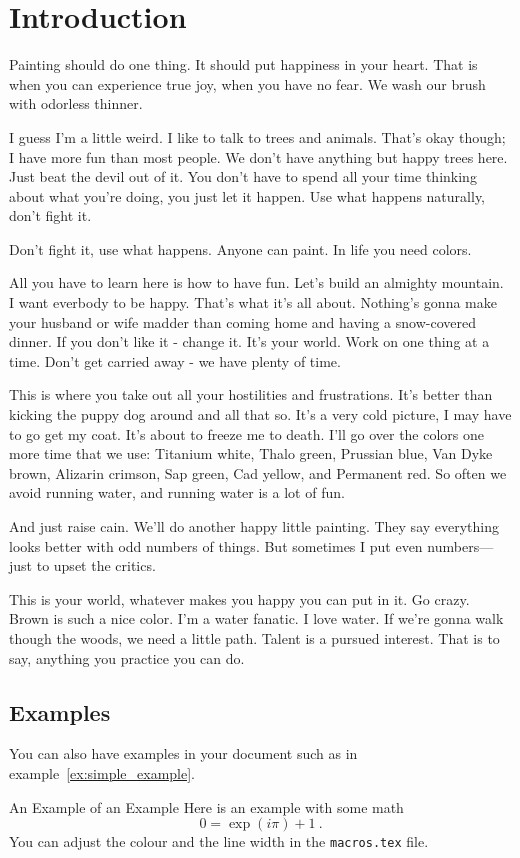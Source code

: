 \chapter{Introduction}\label{ch:introduction}
Painting should do one thing. It should put happiness in your heart. That is when you can experience true joy, when you have no fear. We wash our brush with odorless thinner.

I guess I'm a little weird. I like to talk to trees and animals. That's okay though; I have more fun than most people. We don't have anything but happy trees here. Just beat the devil out of it. You don't have to spend all your time thinking about what you're doing, you just let it happen. Use what happens naturally, don't fight it.

Don't fight it, use what happens. Anyone can paint. In life you need colors.

All you have to learn here is how to have fun. Let's build an almighty mountain. I want everbody to be happy. That's what it's all about. Nothing's gonna make your husband or wife madder than coming home and having a snow-covered dinner. If you don't like it - change it. It's your world. Work on one thing at a time. Don't get carried away - we have plenty of time.

This is where you take out all your hostilities and frustrations. It's better than kicking the puppy dog around and all that so. It's a very cold picture, I may have to go get my coat. It’s about to freeze me to death. I'll go over the colors one more time that we use: Titanium white, Thalo green, Prussian blue, Van Dyke brown, Alizarin crimson, Sap green, Cad yellow, and Permanent red. So often we avoid running water, and running water is a lot of fun.

And just raise cain. We'll do another happy little painting. They say everything looks better with odd numbers of things. But sometimes I put even numbers—just to upset the critics.

This is your world, whatever makes you happy you can put in it. Go crazy. Brown is such a nice color. I'm a water fanatic. I love water. If we're gonna walk though the woods, we need a little path. Talent is a pursued interest. That is to say, anything you practice you can do.


\section{Examples}
You can also have examples in your document such as in example~\ref{ex:simple_example}.
\begin{example}{An Example of an Example}
  \label{ex:simple_example}
  Here is an example with some math
  \begin{equation}
    0 = \exp(i\pi)+1\ .
  \end{equation}
  You can adjust the colour and the line width in the {\tt macros.tex} file.
\end{example}


